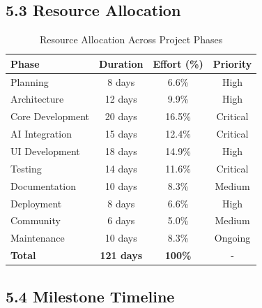 \documentclass[12pt,a4paper]{article}
\begin{document}
\subsection*{\textbf{5.3 Resource Allocation}}

\begin{table}[h]
\centering
\begin{tabular}{|l|c|c|c|}
\hline
\textbf{Phase} & \textbf{Duration} & \textbf{Effort (\%)} & \textbf{Priority} \\
\hline
Planning & 8 days & 6.6\% & High \\
\hline
Architecture & 12 days & 9.9\% & High \\
\hline
Core Development & 20 days & 16.5\% & Critical \\
\hline
AI Integration & 15 days & 12.4\% & Critical \\
\hline
UI Development & 18 days & 14.9\% & High \\
\hline
Testing & 14 days & 11.6\% & Critical \\
\hline
Documentation & 10 days & 8.3\% & Medium \\
\hline
Deployment & 8 days & 6.6\% & High \\
\hline
Community & 6 days & 5.0\% & Medium \\
\hline
Maintenance & 10 days & 8.3\% & Ongoing \\
\hline
\textbf{Total} & \textbf{121 days} & \textbf{100\%} & - \\
\hline
\end{tabular}
\caption{Resource Allocation Across Project Phases}
\end{table}

\subsection*{\textbf{5.4 Milestone Timeline}}
\end{document}
